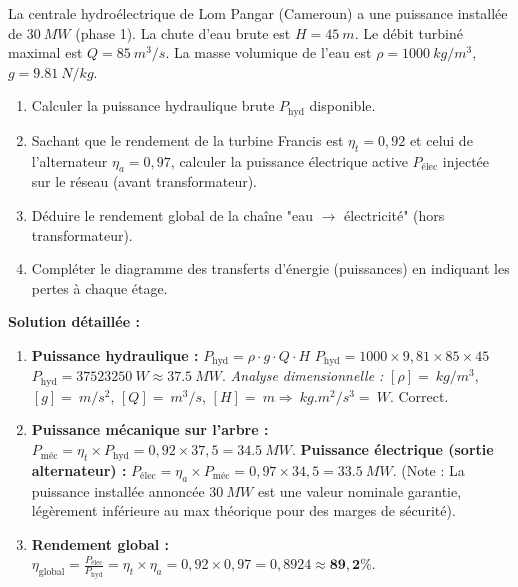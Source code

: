 \documentclass[11pt]{article}
\begin{document}
\begin{exoresolu}
La centrale hydroélectrique de Lom Pangar (Cameroun) a une puissance installée de $\SI{30}{MW}$ (phase 1). La chute d'eau brute est $H = \SI{45}{m}$. Le débit turbiné maximal est $Q = \SI{85}{m^3/s}$. La masse volumique de l'eau est $\rho = \SI{1000}{kg/m^3}$, $g = \SI{9,81}{N/kg}$.
\begin{enumerate}
    \item Calculer la puissance hydraulique brute $P_{\text{hyd}}$ disponible.
    \item Sachant que le rendement de la turbine Francis est $\eta_t = 0,92$ et celui de l'alternateur $\eta_a = 0,97$, calculer la puissance électrique active $P_{\text{élec}}$ injectée sur le réseau (avant transformateur).
    \item Déduire le rendement global de la chaîne "eau $\to$ électricité" (hors transformateur).
    \item Compléter le diagramme des transferts d'énergie (puissances) en indiquant les pertes à chaque étage.
\end{enumerate}
\tcblower
\textbf{Solution détaillée :}
\begin{enumerate}
    \item \textbf{Puissance hydraulique :}
    $P_{\text{hyd}} = \rho \cdot g \cdot Q \cdot H$
    $P_{\text{hyd}} = 1000 \times 9,81 \times 85 \times 45$
    $P_{\text{hyd}} = \SI{37523250}{W} \approx \SI{37,5}{MW}$.
    \textit{Analyse dimensionnelle :} $[\rho] = \SI{}{kg/m^3}$, $[g] = \SI{}{m/s^2}$, $[Q] = \SI{}{m^3/s}$, $[H] = \SI{}{m} \Rightarrow \SI{}{kg.m^2/s^3} = \SI{}{W}$. Correct.
    
    \item \textbf{Puissance mécanique sur l'arbre :}
    $P_{\text{méc}} = \eta_t \times P_{\text{hyd}} = 0,92 \times 37,5 = \SI{34,5}{MW}$.
    \textbf{Puissance électrique (sortie alternateur) :}
    $P_{\text{élec}} = \eta_a \times P_{\text{méc}} = 0,97 \times 34,5 = \SI{33,5}{MW}$.
    (Note : La puissance installée annoncée $\SI{30}{MW}$ est une valeur nominale garantie, légèrement inférieure au max théorique pour des marges de sécurité).
    
    \item \textbf{Rendement global :}
    $\eta_{\text{global}} = \frac{P_{\text{élec}}}{P_{\text{hyd}}} = \eta_t \times \eta_a = 0,92 \times 0,97 = 0,8924 \approx \mathbf{89,2\%}$.
    

\end{enumerate}
\end{exoresolu}
\end{document}
